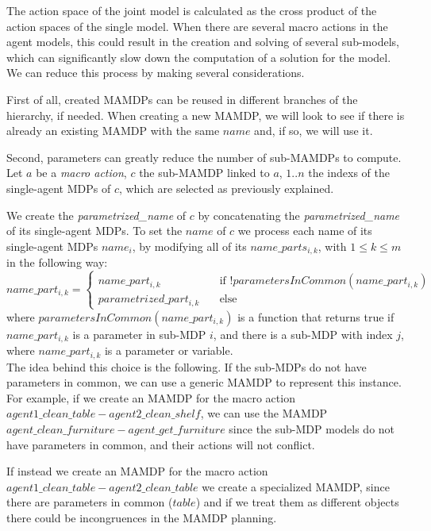 The action space of the joint model is calculated as the cross product of the action spaces of the single model. When there are several macro actions in the agent models, this could result in the creation and solving of several sub-models, which can significantly slow down the computation of a solution for the model. We can reduce this process by making several considerations.

First of all, created MAMDPs can be reused in different branches of the hierarchy, if needed. When creating a new MAMDP, we will look to see if there is already an existing MAMDP with the same $name$ and, if so, we will use it.

Second, parameters can greatly  reduce the number of sub-MAMDPs to compute. Let $a$ be a \textit{macro action}, $c$ the sub-MAMDP linked to $a$, $1..n$ the indexs of the single-agent MDPs of $c$, which are selected as previously explained.

 We create the \textit{parametrized\_name} of $c$ by concatenating the \textit{parametrized\_name} of its single-agent MDPs. To set the $name$ of  $c$ we process each name of its single-agent MDPs $name_i$, by modifying all of its $name\_parts_{i,k}$, with $1 \leq k \leq m$ in the following way:\\
$name\_part_{i,k}=
\begin{cases}
	name\_part_{i,k} & \quad \text{if } !parametersInCommon(name\_part_{i,k}) \\
	parametrized\_part_{i,k} & \quad \text{else}
\end{cases}$ \\
where $parametersInCommon(name\_part_{i,k})$ is a function that returns true if $name\_part_{i,k}$ is a parameter in sub-MDP $i$, and there is a sub-MDP with index $j$, where $name\_part_{i,k}$ is a parameter or variable. \\

The idea behind this choice is the following. If the sub-MDPs do not have parameters in common, we can use a generic MAMDP to represent this instance. For example, if we create an MAMDP for the macro action $agent1\_clean\_table-agent2\_clean\_shelf$, we can use the MAMDP $agent\_clean\_furniture-agent\_get\_furniture$ since the sub-MDP models do not have parameters in common, and their actions will not conflict.

 If instead we create an MAMDP for the macro action $agent1\_clean\_table-agent2\_clean\_table$ we create a specialized MAMDP, since there are parameters in common ($table$) and if we treat them as different objects there could be incongruences in the MAMDP planning.

